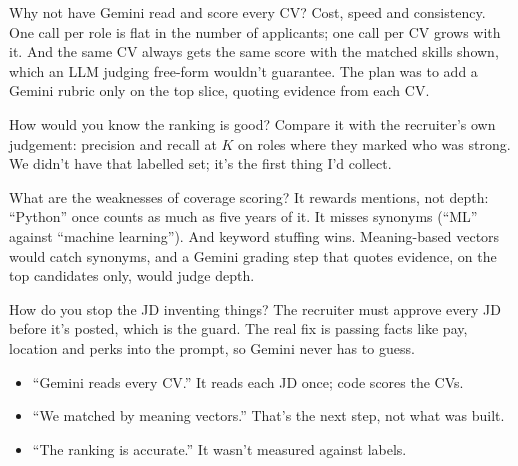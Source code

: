 \begin{iq}[\core]{Why not have Gemini read and score every CV?}
Cost, speed and consistency. One call per role is flat in the number of applicants; one call per CV grows with it. And the same CV always gets the same score with the matched skills shown, which an LLM judging free-form wouldn't guarantee. The plan was to add a Gemini rubric only on the top slice, quoting evidence from each CV.
\end{iq}

\begin{iq}[\core]{How would you know the ranking is good?}
Compare it with the recruiter's own judgement: precision and recall at $K$ on roles where they marked who was strong. We didn't have that labelled set; it's the first thing I'd collect.
\end{iq}

\begin{iq}{What are the weaknesses of coverage scoring?}
It rewards mentions, not depth: ``Python'' once counts as much as five years of it. It misses synonyms (``ML'' against ``machine learning''). And keyword stuffing wins. Meaning-based vectors would catch synonyms, and a Gemini grading step that quotes evidence, on the top candidates only, would judge depth.
\end{iq}

\begin{iq}{How do you stop the JD inventing things?}
The recruiter must approve every JD before it's posted, which is the guard. The real fix is passing facts like pay, location and perks into the prompt, so Gemini never has to guess.
\end{iq}

\begin{bugfix}
\begin{itemize}
  \item ``Gemini reads every CV.'' It reads each JD once; code scores the CVs.
  \item ``We matched by meaning vectors.'' That's the next step, not what was built.
  \item ``The ranking is accurate.'' It wasn't measured against labels.
\end{itemize}
\end{bugfix}
